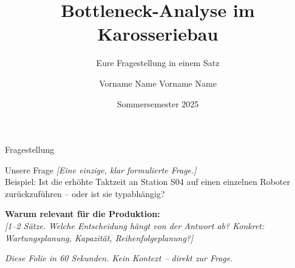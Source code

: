 \documentclass[aspectratio=169, 11pt]{beamer}
\title{Bottleneck-Analyse im Karosseriebau}
\subtitle{Eure Fragestellung in einem Satz}
\author{Vorname Name \quad Vorname Name}
\institute{Datenanalyse im Produktionsumfeld}
\date{Sommersemester 2025}
\newcommand{\hinweis}[1]{%
  \vspace{4pt}%
  {\scriptsize\color{mutedtext}\textit{#1}}%
}
\begin{document}
\maketitle

\begin{frame}{Fragestellung}

  \begin{block}{Unsere Frage}
    \textit{[Eine einzige, klar formulierte Frage.]}\\
    {\small Beispiel: Ist die erhöhte Taktzeit an Station S04 auf einen
    einzelnen Roboter zurückzuführen -- oder ist sie typabhängig?}
  \end{block}

  \vspace{8pt}
  \textbf{Warum relevant für die Produktion:}\\[4pt]
  \textit{[1--2 Sätze. Welche Entscheidung hängt von der Antwort ab?
  Konkret: Wartungsplanung, Kapazität, Reihenfolgeplanung?]}

  \vspace{8pt}
  \hinweis{Diese Folie in 60 Sekunden. Kein Kontext -- direkt zur Frage.}

\end{frame}
\end{document}
